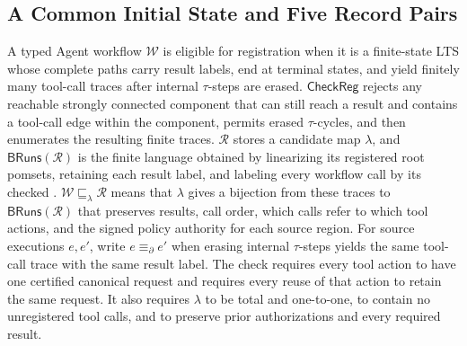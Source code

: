 \subsection{A Common Initial State and Five Record Pairs}
\label{app:boot-pairs}

\begin{definition}
\label{def:registration-refinement}
A typed Agent workflow \(\mathcal W\) is eligible for registration when it is a finite-state LTS whose complete paths carry result labels, end at terminal states, and yield finitely many tool-call traces after internal \(\tau\)-steps are erased.
\(\mathsf{CheckReg}\) rejects any reachable strongly connected component that can still reach a result and contains a tool-call edge within the component, permits erased \(\tau\)-cycles, and then enumerates the resulting finite traces.
\(\mathcal R\) stores a candidate map \(\lambda\), and \(\mathsf{BRuns}(\mathcal R)\) is the finite language obtained by linearizing its registered root pomsets, retaining each result label, and labeling every workflow call by its checked \Use.
\(\mathcal W\sqsubseteq_\lambda\mathcal R\) means that \(\lambda\) gives a bijection from these traces to \(\mathsf{BRuns}(\mathcal R)\) that preserves results, call order, which calls refer to which tool actions, and the signed policy authority for each source region.
For source executions \(e,e'\), write \(e\equiv_\partial e'\) when erasing internal \(\tau\)-steps yields the same tool-call trace with the same result label.
The check requires every tool action to have one certified canonical request and requires every reuse of that action to retain the same request.
It also requires \(\lambda\) to be total and one-to-one, to contain no unregistered tool calls, and to preserve prior authorizations and every required result.
\end{definition}

